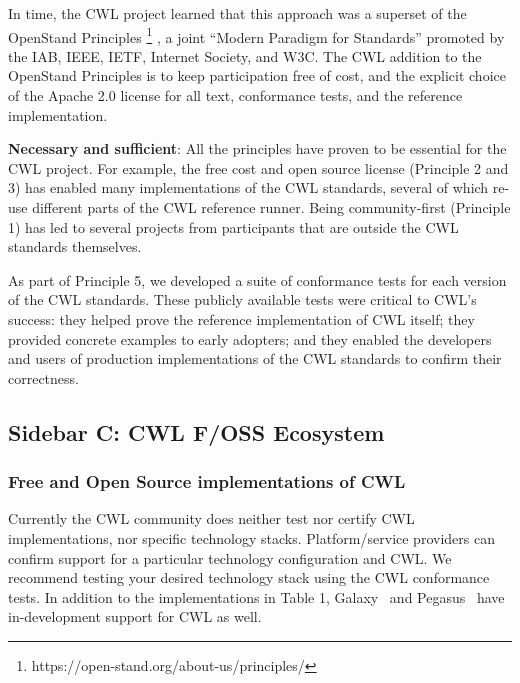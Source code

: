 \documentclass[sigconf,authordraft]{acmart}
\begin{document}
In time, the CWL project learned that this approach was a superset of
the OpenStand Principles \footnote{https://open-stand.org/about-us/principles/} , a joint ``Modern Paradigm for Standards'' promoted by the IAB, IEEE, IETF,
Internet Society, and W3C. The CWL addition to the OpenStand Principles
is to keep participation free of cost, and the explicit choice of the
Apache 2.0 license for all text, conformance tests, and the reference
implementation.

\textbf{Necessary and sufficient}: All the principles have proven to be
essential for the CWL project. For example, the free cost and open
source license (Principle 2 and 3) has enabled many implementations of
the CWL standards, several of which re-use different parts of the CWL
reference runner. Being community-first (Principle 1) has led to several
projects from participants that are outside the CWL standards
themselves.

As part of Principle 5, we developed a suite of conformance
tests for each version of the CWL standards. These publicly available
tests were critical to CWL's success: they helped prove the reference
implementation of CWL itself; they provided concrete examples to early
adopters; and they enabled the developers and users of production
implementations of the CWL standards to confirm their correctness.

\subsection{Sidebar C: CWL F/OSS Ecosystem}

\subsubsection{Free and Open Source implementations of CWL}

Currently the CWL community does neither test nor certify CWL
implementations, nor specific technology stacks. Platform/service
providers can confirm support for a particular technology
configuration and CWL. We recommend testing your desired technology
stack using the CWL conformance tests. In addition to the
implementations in Table 1, Galaxy~\cite{afgan_galaxy_2018}
and Pegasus~\cite{deelman_pegasus_2015}
have in-development support for CWL as well.
\end{document}
